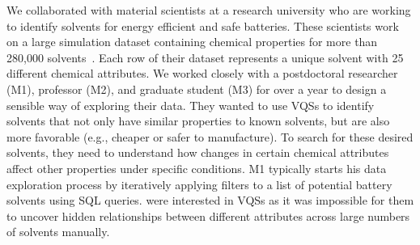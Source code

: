\par\noindent{} We collaborated with material scientists at a research university who are working to identify solvents for energy efficient and safe batteries. These scientists work on a large simulation dataset containing chemical properties for more than 280,000 solvents~\cite{Khetan2018}. Each row of their dataset represents a unique solvent with 25 different chemical attributes. We worked closely with a postdoctoral researcher (M1), professor (M2), and graduate student (M3) for over a year to design a sensible way of exploring their data. They wanted to use VQSs to identify solvents that not only have similar properties to known solvents, but are also more favorable (e.g., cheaper or safer to manufacture). To search for these desired solvents, they need to understand how changes in certain chemical attributes affect other properties under specific conditions.
\npar M1 typically starts his data exploration process by iteratively applying filters to a list of potential battery solvents using SQL queries.  were interested in VQSs as it was impossible for them to uncover hidden relationships between different attributes across large numbers of solvents manually.%
